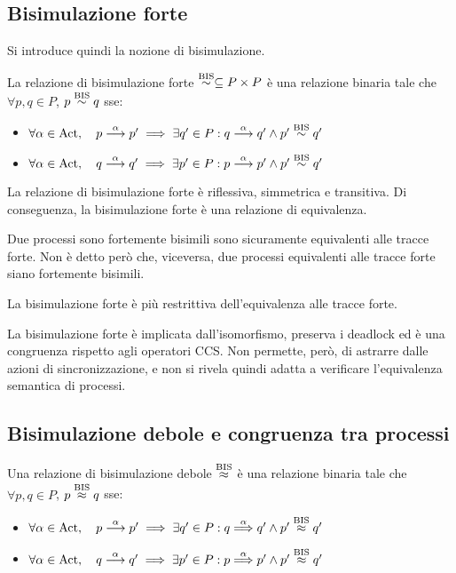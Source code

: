\subsection*{Bisimulazione forte}
Si introduce quindi la nozione di bisimulazione.

\begin{defn}
    La relazione di bisimulazione forte
    $\overset{\textnormal{BIS}}{\sim} \subseteq P \times P$
    è una relazione binaria tale che $\forall p, q \in P$, $p \overset{\textnormal{BIS}}{\sim} q$ sse:
    \begin{itemize}
        \item $\forall \alpha \in \text{Act}, \quad p \overset{\alpha}{\longrightarrow} p'
        \implies \exists q' \in P : q \overset{\alpha}{\longrightarrow} q' \land p' \overset{\textnormal{BIS}}{\sim} q'$
        \item $\forall \alpha \in \text{Act}, \quad q \overset{\alpha}{\longrightarrow} q'
        \implies \exists p' \in P : p \overset{\alpha}{\longrightarrow} p' \land p' \overset{\textnormal{BIS}}{\sim} q'$
    \end{itemize}
\end{defn}

\begin{rem}
    La relazione di bisimulazione forte è riflessiva, simmetrica e transitiva.
    Di conseguenza, la bisimulazione forte è una relazione di equivalenza.
\end{rem}

\begin{rem}
    Due processi sono fortemente bisimili sono sicuramente equivalenti alle
    tracce forte.
    Non è detto però che, viceversa, due processi equivalenti alle tracce
    forte siano fortemente bisimili.
\end{rem}

\begin{rem}
    La bisimulazione forte è più restrittiva dell'equivalenza alle tracce forte.
\end{rem}

La bisimulazione forte è implicata dall'isomorfismo, preserva i deadlock ed è
una congruenza rispetto agli operatori CCS. Non permette, però, di astrarre dalle
azioni di sincronizzazione, e non si rivela quindi adatta a verificare
l'equivalenza semantica di processi.

\subsection*{Bisimulazione debole e congruenza tra processi}
\begin{defn}
    Una relazione di bisimulazione debole $\overset{\textnormal{BIS}}{\approx}$ è una relazione
    binaria tale che $\forall p, q \in P$, $p \overset{\textnormal{BIS}}{\approx} q$ sse:
    \begin{itemize}
        \item $\forall \alpha \in \text{Act}, \quad p \overset{\alpha}{\longrightarrow} p'
        \implies \exists q' \in P : q \overset{\alpha}{\Longrightarrow} q' \land p' \overset{\textnormal{BIS}}{\approx} q'$
        \item $\forall \alpha \in \text{Act}, \quad q \overset{\alpha}{\longrightarrow} q'
        \implies \exists p' \in P : p \overset{\alpha}{\Longrightarrow} p' \land p' \overset{\textnormal{BIS}}{\approx} q'$
    \end{itemize}
\end{defn}

